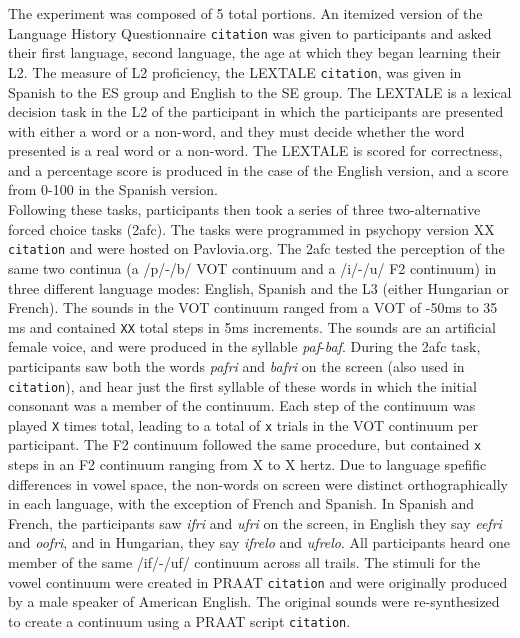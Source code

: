 \documentclass[
  english,
  man]{apa6}
\begin{document}
The experiment was composed of 5 total portions. An itemized version of the Language History Questionnaire \texttt{citation} was given to participants and asked their first language, second language, the age at which they began learning their L2. The measure of L2 proficiency, the LEXTALE \texttt{citation}, was given in Spanish to the ES group and English to the SE group. The LEXTALE is a lexical decision task in the L2 of the participant in which the participants are presented with either a word or a non-word, and they must decide whether the word presented is a real word or a non-word. The LEXTALE is scored for correctness, and a percentage score is produced in the case of the English version, and a score from 0-100 in the Spanish version.\\
Following these tasks, participants then took a series of three two-alternative forced choice tasks (2afc). The tasks were programmed in psychopy version XX \texttt{citation} and were hosted on Pavlovia.org. The 2afc tested the perception of the same two continua (a /p/-/b/ VOT continuum and a /i/-/u/ F2 continuum) in three different language modes: English, Spanish and the L3 (either Hungarian or French). The sounds in the VOT continuum ranged from a VOT of -50ms to 35 ms and contained \texttt{XX} total steps in 5ms increments. The sounds are an artificial female voice, and were produced in the syllable \emph{paf}-\emph{baf}. During the 2afc task, participants saw both the words \emph{pafri} and \emph{bafri} on the screen (also used in \texttt{citation}), and hear just the first syllable of these words in which the initial consonant was a member of the continuum. Each step of the continuum was played \texttt{X} times total, leading to a total of \texttt{x} trials in the VOT continuum per participant. The F2 continuum followed the same procedure, but contained \texttt{x} steps in an F2 continuum ranging from X to X hertz. Due to language spefific differences in vowel space, the non-words on screen were distinct orthographically in each language, with the exception of French and Spanish. In Spanish and French, the participants saw \emph{ifri} and \emph{ufri} on the screen, in English they say \emph{eefri} and \emph{oofri}, and in Hungarian, they say \emph{ifrelo} and \emph{ufrelo}. All participants heard one member of the same /if/-/uf/ continuum across all trails. The stimuli for the vowel continuum were created in PRAAT \texttt{citation} and were originally produced by a male speaker of American English. The original sounds were re-synthesized to create a continuum using a PRAAT script \texttt{citation}.
\end{document}
